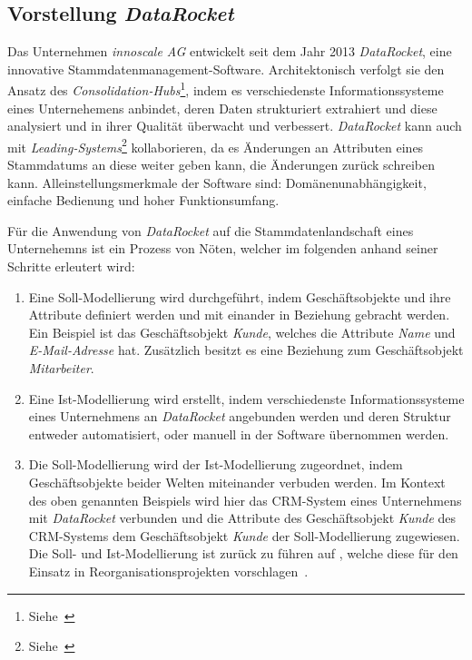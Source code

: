\documentclass[
  language=german, %
  type=bachelor%
]{isthesis}
\begin{document}
\begin{content}
  \section{Vorstellung \textit{DataRocket}}

	Das Unternehmen \textit{innoscale AG} entwickelt seit dem Jahr 2013
	\textit{DataRocket}, eine innovative Stammdatenmanagement-Software.
	Architektonisch verfolgt sie den Ansatz des
	\textit{Consolidation-Hubs}\footnote{Siehe~\cite{baghi2014toward}}, indem es
	verschiedenste Informationssysteme eines Unternehemens anbindet, deren Daten
	strukturiert extrahiert und diese analysiert und in ihrer Qualität überwacht
	und verbessert. \textit{DataRocket} kann auch mit
	\textit{Leading-Systems}\footnote{Siehe~\cite{baghi2014toward}}
	kollaborieren, da es Änderungen an Attributen eines Stammdatums an diese
	weiter geben kann, \bzw{} die Änderungen zurück schreiben kann.
	Alleinstellungsmerkmale der Software sind: Domänenunabhängigkeit, einfache
	Bedienung und hoher Funktionsumfang.

	Für die Anwendung von \textit{DataRocket} auf die Stammdatenlandschaft eines
	Unternehemns ist ein Prozess von Nöten, welcher im folgenden anhand seiner
	Schritte erleutert wird:

	\begin{enumerate}
		\item Eine Soll-Modellierung wird durchgeführt, indem Geschäftsobjekte und
		ihre Attribute definiert werden und mit einander in Beziehung gebracht
		werden. Ein Beispiel ist das Geschäftsobjekt \textit{Kunde}, welches die
		Attribute \textit{Name} und \textit{E-Mail-Adresse} hat. Zusätzlich besitzt es
		eine Beziehung zum Geschäftsobjekt \textit{Mitarbeiter}. 

		\item Eine Ist-Modellierung wird erstellt, indem verschiedenste
		Informationssysteme eines Unternehmens an \textit{DataRocket} angebunden
		werden und deren Struktur entweder automatisiert, oder manuell in der
		Software übernommen werden. 

		\item Die Soll-Modellierung wird der Ist-Modellierung zugeordnet, indem
		Geschäftsobjekte beider Welten miteinander verbuden werden. Im Kontext des
		oben genannten Beispiels wird hier das \acrshort{CRM}-System eines
		Unternehmens mit \textit{DataRocket} verbunden und die Attribute des
		Geschäftsobjekt \textit{Kunde} des \acrshort{CRM}-Systems dem
		Geschäftsobjekt \textit{Kunde} der Soll-Modellierung zugewiesen. Die Soll-
		und Ist-Modellierung ist zurück zu führen auf
		\textsc{\citeauthor{becker2006konzeptionelle}}, welche diese \zB{} für den
		Einsatz in \glqq{}Reorganisationsprojekten\grqq{} vorschlagen~\cite[][S.
		3]{becker2006konzeptionelle}.


\end{enumerate}
\end{content}
\end{document}
